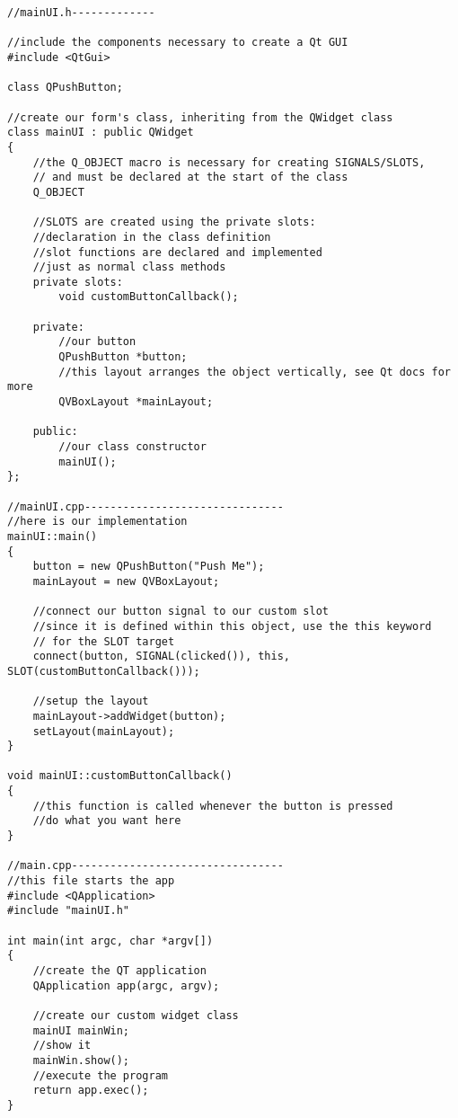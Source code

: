 \begin{verbatim}
//mainUI.h-------------

//include the components necessary to create a Qt GUI
#include <QtGui>

class QPushButton;

//create our form's class, inheriting from the QWidget class
class mainUI : public QWidget
{
    //the Q_OBJECT macro is necessary for creating SIGNALS/SLOTS,
    // and must be declared at the start of the class
    Q_OBJECT

    //SLOTS are created using the private slots: 
    //declaration in the class definition
    //slot functions are declared and implemented 
    //just as normal class methods
    private slots:
        void customButtonCallback();

    private:
        //our button
        QPushButton *button;
        //this layout arranges the object vertically, see Qt docs for more
        QVBoxLayout *mainLayout;

    public:
        //our class constructor
        mainUI();
};

//mainUI.cpp-------------------------------
//here is our implementation
mainUI::main()
{
    button = new QPushButton("Push Me");
    mainLayout = new QVBoxLayout;

    //connect our button signal to our custom slot
    //since it is defined within this object, use the this keyword 
    // for the SLOT target
    connect(button, SIGNAL(clicked()), this, SLOT(customButtonCallback()));

    //setup the layout
    mainLayout->addWidget(button);
    setLayout(mainLayout);
}

void mainUI::customButtonCallback()
{
    //this function is called whenever the button is pressed
    //do what you want here
}

//main.cpp---------------------------------
//this file starts the app
#include <QApplication>
#include "mainUI.h"

int main(int argc, char *argv[])
{
    //create the QT application
    QApplication app(argc, argv);

    //create our custom widget class
    mainUI mainWin;
    //show it
    mainWin.show();
    //execute the program
    return app.exec();
}
\end{verbatim}




